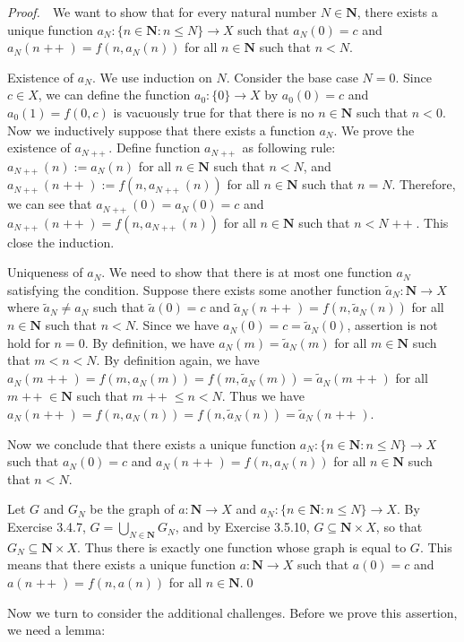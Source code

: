 \documentclass{book}
\DeclareMathOperator{\tadd}{+\!+}%
\newcommand{\pff}{\vspace{.25em}\noindent\emph{Proof.}~~}
\newcounter{Exercise}[section]
\begin{document}
\pff We want to show that for every natural number $N\in\mathbf{N}$, there exists a unique function $a_N:\{n\in\mathbf{N}:n\leq N\}\to X$ such that $a_N(0)=c$ and $a_N(n\tadd)=f(n,a_N(n))$ for all $n\in\mathbf{N}$ such that $n<N$.

Existence of $a_N$. We use induction on $N$. Consider the base case $N=0$. Since $c\in X$, we can define the function $a_0:\{0\}\to X$ by $a_0(0)=c$ and $a_0(1)=f(0,c)$ is vacuously true for that there is no $n\in\mathbf{N}$ such that $n<0$. Now we inductively suppose that there exists a function $a_N$. We prove the existence of $a_{N\tadd}$. Define function $a_{N\tadd}$ as following rule: $a_{N\tadd}(n):=a_N(n)$ for all $n\in\mathbf{N}$ such that $n<N$, and $a_{N\tadd}(n\tadd):=f(n,a_{N\tadd}(n))$ for all $n\in\mathbf{N}$ such that $n=N$. Therefore, we can see that $a_{N\tadd}(0)=a_{N}(0)=c$ and $a_{N\tadd}(n\tadd)=f(n,a_{N\tadd}(n))$ for all $n\in\mathbf{N}$ such that $n<N\tadd$. This close the induction.

Uniqueness of $a_N$. We need to show that there is at most one function $a_N$ satisfying the condition. Suppose there exists some another function $\widetilde a_N:\mathbf{N}\to X$ where $\widetilde a_N\neq a_N$ such that $\widetilde a(0)=c$ and $\widetilde a_N(n\tadd)=f(n,\widetilde a_N(n))$ for all $n\in\mathbf{N}$ such that $n<N$. Since we have $a_N(0)=c=\widetilde a_N(0)$, assertion is not hold for $n=0$. By definition, we have $a_N(m)=\widetilde a_N(m)$ for all $m\in\mathbf{N}$ such that $m<n<N$. By definition again, we have $a_N(m\tadd)=f(m,a_N(m))=f(m,\widetilde a_N(m))=\widetilde a_N(m\tadd)$ for all $m\tadd\in\mathbf{N}$ such that $m\tadd\leq n<N$. Thus we have $a_N(n\tadd)=f(n,a_N(n))=f(n,\widetilde a_N(n))=\widetilde a_N(n\tadd)$.

Now we conclude that there exists a unique function $a_N:\{n\in\mathbf{N}:n\leq N\}\to X$ such that $a_N(0)=c$ and $a_N(n\tadd)=f(n,a_N(n))$ for all $n\in\mathbf{N}$ such that $n<N$.

Let $G$ and $G_N$ be the graph of $a:\mathbf{N}\to X$ and $a_N:\{n\in\mathbf{N}:n\leq N\}\to X$. By Exercise 3.4.7, $G=\bigcup_{N\in\mathbf{N}}G_N$, and by Exercise 3.5.10, $G\subseteq \mathbf{N}\times X$, so that $G_N\subseteq\mathbf{N}\times X$. Thus there is exactly one function whose graph is equal to $G$. This means that there exists a unique function $a:\mathbf{N}\to X$ such that $a(0)=c$ and $a(n\tadd)=f(n,a(n))$ for all $n\in\mathbf{N}$.\qed

Now we turn to consider the additional challenges. Before we prove this assertion, we need a lemma:
\end{document}

